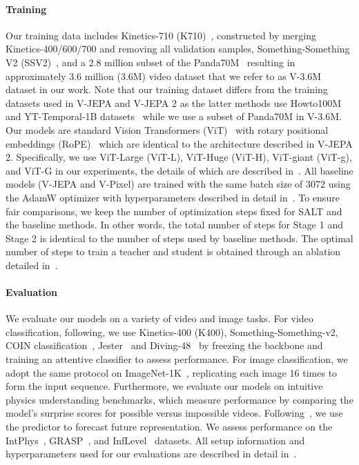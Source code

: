 \documentclass{applemlr}
\numberwithin{equation}{section}
\newcommand{\ourmethod}{SALT\xspace}
\begin{document}
\paragraph{Training}
Our training data includes Kinetics-710 (K710)~\citet{kay2017kinetics}, constructed by merging Kinetics-400/600/700 and removing all validation samples, Something-Something V2 (SSV2)~\citet{goyal2017something}, and a 2.8 million subset of the Panda70M~\cite{chen2024panda70m} resulting in approximately 3.6 million (3.6M) video dataset that we refer to as V-3.6M dataset in our work. Note that our training dataset differs from the training datasets used in V-JEPA and V-JEPA 2 as the latter methods use Howto100M~\citep{miech2019howto100m} and YT-Temporal-1B datasets~\citep{zellers2022merlot} while we use a subset of Panda70M in V-3.6M. Our models are standard Vision Transformers (ViT)~\citep{vit_dosovitskiy2020} with rotary positional embeddings (RoPE)~\citep{su2024roformer} which are identical to the architecture described in V-JEPA 2. Specifically, we use ViT-Large (ViT-L), ViT-Huge (ViT-H), ViT-giant (ViT-g), and ViT-G in our experiments, the details of which are described in~. All baseline models (V-JEPA and V-Pixel) are trained with the same batch size of 3072 using the AdamW optimizer with hyperparameters described in detail in~.
 To ensure fair comparisons, we keep the number of optimization steps fixed for \ourmethod and the baseline methods. In other words, the total number of steps for Stage 1 and Stage 2 is identical to the number of steps used by baseline methods. The optimal number of steps to train a teacher and student is obtained through an ablation detailed in~.

\paragraph{Evaluation} 
We evaluate our models on a variety of video and image tasks. For video classification, following, we use Kinetics-400 (K400), Something-Something-v2, COIN classification~\citep{tang2019coin}, Jester~\citep{jester_materzynska2019} and Diving-48~\citep{diving48_Li_2018_ECCV} by freezing the backbone and training an attentive classifier to assess performance. For image classification, we adopt the same protocol on ImageNet-1K~\citep{imagenet_russakovsky2015}, replicating each image 16 times to form the input sequence.
Furthermore, we evaluate our models on intuitive physics understanding benchmarks, which measure performance by comparing the model’s surprise scores for possible versus impossible videos. Following~\citep{garrido2025intuitive}, we use the predictor to forecast future representation. We assess performance on the IntPhys~\citep{riochet2018intphys}, GRASP~\citep{jassim2023grasp}, and InfLevel~\citep{weihs_inflevel} datasets. All setup information and hyperparameters used for our evaluations are described in detail in~.
\end{document}
